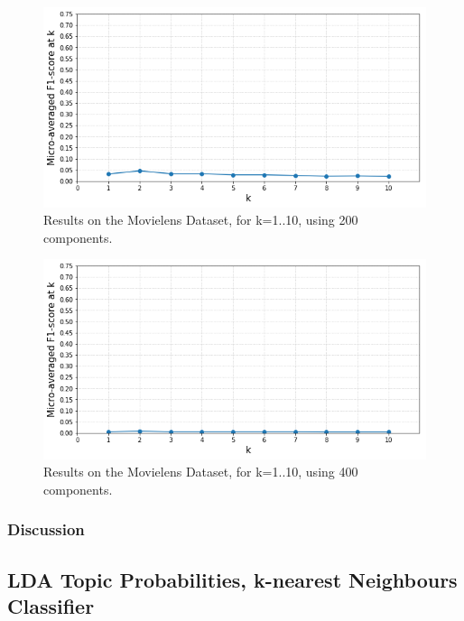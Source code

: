 \begin{figure}[H]
    \centering
    \includegraphics[width=\textwidth]{chapters/05_experiments/images/topic-words-200d-movielens.png}
    \caption{Results on the Movielens Dataset, for k=1..10, using 200 components.}
    \label{fig:ovr_svm_movielens}
\end{figure}

\begin{figure}[H]
    \centering
    \includegraphics[width=\textwidth]{chapters/05_experiments/images/topic-words-400d-movielens.png}
    \caption{Results on the Movielens Dataset, for k=1..10, using 400 components.}
    \label{fig:ovr_svm_movielens}
\end{figure}

\subsubsection{Discussion}

\subsection{LDA Topic Probabilities, k-nearest Neighbours Classifier}

